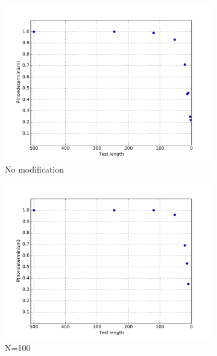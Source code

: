 \begin{figure}
\centering 
\begin{subfigure}{0.30\columnwidth}
\centering
\includegraphics[width=\columnwidth]{lengthddmin}
\caption{No modification}
\label{fig:p1}
\end{subfigure}
\begin{subfigure}{0.30\columnwidth}
\centering
\includegraphics[width=\columnwidth]{lengthddminforcep}
\caption{N=100}
\label{fig:p2}
\end{subfigure}
\begin{subfigure}{0.30\columnwidth}
\centering

\end{subfigure}
\end{figure}
